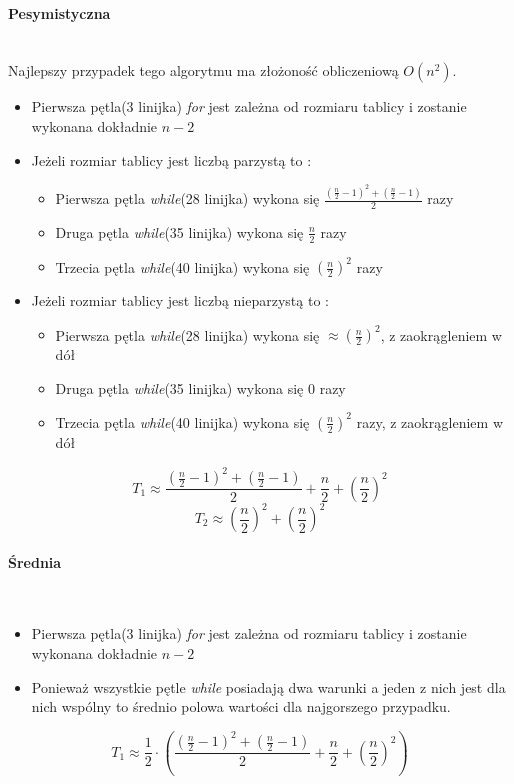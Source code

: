 \paragraph{Pesymistyczna}\mbox{}\\
Najlepszy przypadek tego algorytmu ma złożoność obliczeniową $O(n^2)$. 
\begin{itemize}
\item Pierwsza pętla(3 linijka) \textit{for} jest zależna od rozmiaru tablicy i zostanie wykonana dokładnie $n-2$
\item Jeżeli rozmiar tablicy jest liczbą parzystą to :
\begin{itemize}
\item Pierwsza pętla \textit{while}(28 linijka) wykona się $\frac{(\frac{n}{2}-1)^2+(\frac{n}{2}-1)}{2}$ razy
\item Druga pętla \textit{while}(35 linijka) wykona się $\frac{n}{2}$ razy
\item Trzecia pętla \textit{while}(40 linijka) wykona się $(\frac{n}{2})^2$ razy

\end{itemize}
\item Jeżeli rozmiar tablicy jest liczbą nieparzystą to :
\begin{itemize}
\item Pierwsza pętla \textit{while}(28 linijka) wykona się  $\approx (\frac{n}{2})^{2}$, z zaokrągleniem w dół
\item Druga pętla \textit{while}(35	 linijka) wykona się $0$ razy
\item Trzecia pętla \textit{while}(40 linijka) wykona się $(\frac{n}{2})^2$ razy, z zaokrągleniem w dół

\end{itemize}
\end{itemize}
\begin{equation*}
T_{1} \approx \frac{(\frac{n}{2}-1)^2+(\frac{n}{2}-1)}{2} + \frac{n}{2} +(\frac{n}{2})^2
\end{equation*}
\begin{equation*}
T_{2}  \approx (\frac{n}{2})^{2} + (\frac{n}{2})^2
\end{equation*}
\wyjT
\paragraph{Średnia}\mbox{}\\
\begin{itemize}
\item Pierwsza pętla(3 linijka) \textit{for} jest zależna od rozmiaru tablicy i zostanie wykonana dokładnie $n-2$
\item Ponieważ wszystkie pętle \textit{while} posiadają dwa warunki a jeden z nich jest dla nich wspólny to średnio polowa wartości dla najgorszego przypadku.
\end{itemize}
\begin{equation*}
T_{1} \approx  \frac{1}{2}\cdot(\frac{(\frac{n}{2}-1)^2+(\frac{n}{2}-1)}{2} + \frac{n}{2} +(\frac{n}{2})^2)
\end{equation*}
